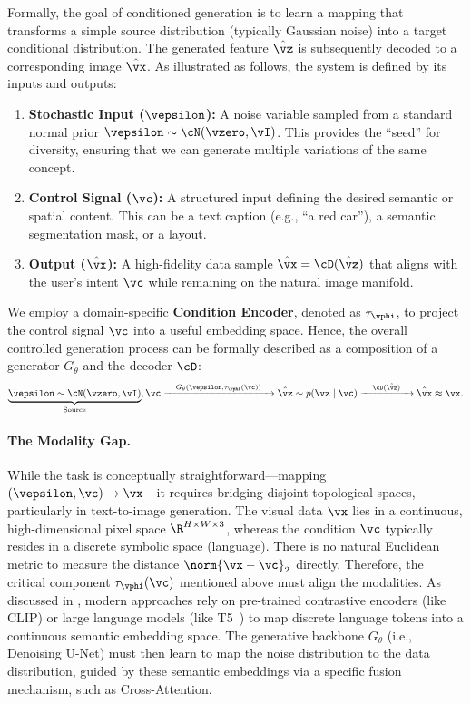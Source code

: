 \documentclass[../../book-main.tex]{subfiles}
\begin{document}
Formally, the goal of conditioned generation is to learn a mapping that transforms a simple source distribution (typically Gaussian noise) into a target conditional distribution.
The generated feature \(\hat{\vz}\) is subsequently decoded to a corresponding image \(\hat{\vx}\).
As illustrated as follows, the system is defined by its inputs and outputs:
\begin{enumerate}
    \item \textbf{Stochastic Input (\(\vepsilon\)):} A noise variable sampled from a standard normal prior \(\vepsilon \sim \cN(\vzero, \vI)\).
This provides the ``seed'' for diversity, ensuring that we can generate multiple variations of the same concept.
    \item \textbf{Control Signal (\(\vc\)):} A structured input defining the desired semantic or spatial content.
This can be a text caption (e.g., ``a red car''), a semantic segmentation mask, or a layout.
    \item \textbf{Output (\(\hat{\vx}\)):} A high-fidelity data sample \(\hat{\vx} = \cD(\hat{\vz})\) that aligns with the user's intent \(\vc\) while remaining on the natural image manifold.
\end{enumerate}
We employ a domain-specific \textbf{Condition Encoder}, denoted as \(\tau_{\vphi}\), to project the control signal \(\vc\) into a useful embedding space.
Hence, the overall controlled generation process can be formally described as a composition of a generator \(G_{\theta}\) and the decoder \(\cD\):
\begin{equation}
    \underbrace{\vepsilon \sim \cN(\vzero, \vI)}_{\text{Source}}, \vc 
    \xrightarrow{\quad G_{\theta}(\vepsilon, \tau_{\vphi}(\vc)) \quad} 
    \hat{\vz} \sim p(\vz \mid \vc) 
    \xrightarrow{\quad \cD(\hat{\vz}) \quad} 
    \hat{\vx} \approx \vx .
\end{equation}

\paragraph{The Modality Gap.}
While the task is conceptually straightforward—mapping \((\vepsilon, \vc) \to \vx\)—it requires bridging disjoint topological spaces, particularly in text-to-image generation.
The visual data \(\vx\) lies in a continuous, high-dimensional pixel space \(\R^{H \times W \times 3}\), whereas the condition \(\vc\) typically resides in a discrete symbolic space (language).
There is no natural Euclidean metric to measure the distance \(\norm{\vx - \vc}_{2}\) directly.
Therefore, the critical component \(\tau_{\vphi}(\vc)\) mentioned above must align the modalities.
As discussed in , modern approaches rely on pre-trained contrastive encoders (like CLIP) or large language models (like T5~\citep{raffel2020exploring}) to map discrete language tokens into a continuous semantic embedding space.
The generative backbone \(G_{\theta}\) (i.e., Denoising U-Net) must then learn to map the noise distribution to the data distribution, guided by these semantic embeddings via a specific fusion mechanism, such as Cross-Attention.
\end{document}
